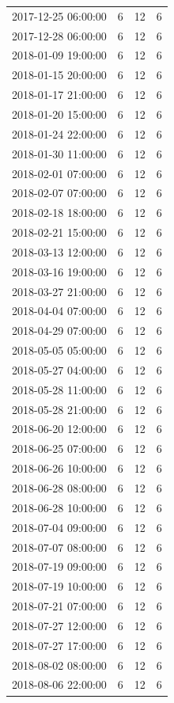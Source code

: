\begin{tabular}{lrrr}
2017-12-25 06:00:00 & 6 & 12 & 6 \\
2017-12-28 06:00:00 & 6 & 12 & 6 \\
2018-01-09 19:00:00 & 6 & 12 & 6 \\
2018-01-15 20:00:00 & 6 & 12 & 6 \\
2018-01-17 21:00:00 & 6 & 12 & 6 \\
2018-01-20 15:00:00 & 6 & 12 & 6 \\
2018-01-24 22:00:00 & 6 & 12 & 6 \\
2018-01-30 11:00:00 & 6 & 12 & 6 \\
2018-02-01 07:00:00 & 6 & 12 & 6 \\
2018-02-07 07:00:00 & 6 & 12 & 6 \\
2018-02-18 18:00:00 & 6 & 12 & 6 \\
2018-02-21 15:00:00 & 6 & 12 & 6 \\
2018-03-13 12:00:00 & 6 & 12 & 6 \\
2018-03-16 19:00:00 & 6 & 12 & 6 \\
2018-03-27 21:00:00 & 6 & 12 & 6 \\
2018-04-04 07:00:00 & 6 & 12 & 6 \\
2018-04-29 07:00:00 & 6 & 12 & 6 \\
2018-05-05 05:00:00 & 6 & 12 & 6 \\
2018-05-27 04:00:00 & 6 & 12 & 6 \\
2018-05-28 11:00:00 & 6 & 12 & 6 \\
2018-05-28 21:00:00 & 6 & 12 & 6 \\
2018-06-20 12:00:00 & 6 & 12 & 6 \\
2018-06-25 07:00:00 & 6 & 12 & 6 \\
2018-06-26 10:00:00 & 6 & 12 & 6 \\
2018-06-28 08:00:00 & 6 & 12 & 6 \\
2018-06-28 10:00:00 & 6 & 12 & 6 \\
2018-07-04 09:00:00 & 6 & 12 & 6 \\
2018-07-07 08:00:00 & 6 & 12 & 6 \\
2018-07-19 09:00:00 & 6 & 12 & 6 \\
2018-07-19 10:00:00 & 6 & 12 & 6 \\
2018-07-21 07:00:00 & 6 & 12 & 6 \\
2018-07-27 12:00:00 & 6 & 12 & 6 \\
2018-07-27 17:00:00 & 6 & 12 & 6 \\
2018-08-02 08:00:00 & 6 & 12 & 6 \\
2018-08-06 22:00:00 & 6 & 12 & 6 \\

\end{tabular}
